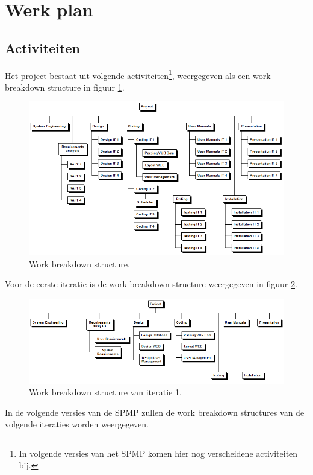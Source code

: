 \section{Werk plan} \label{sec:workplan}
\subsection{Activiteiten}
Het project bestaat uit volgende activiteiten\footnote{In volgende versies van het SPMP komen hier nog verscheidene activiteiten bij.}, weergegeven als een work breakdown structure in figuur \ref{fig:workbreakdownstructure}.
\begin{figure} [H]
    \centering
    \includegraphics[width = \textwidth]{ManagerialProcess/WBSChart.png}
    \caption{Work breakdown structure.}
	\label{fig:workbreakdownstructure}
\end{figure}
Voor de eerste iteratie is de work breakdown structure weergegeven in figuur \ref{fig:wbsIteratie1}.
\begin{figure} [H]
	\centering
	\includegraphics[width = \textwidth]{ManagerialProcess/WBSChartIteratie1.png}
	\caption{Work breakdown structure van iteratie 1.}
	\label{fig:wbsIteratie1}
\end{figure}
In de volgende versies van de SPMP zullen de work breakdown structures van de volgende iteraties worden weergegeven.
